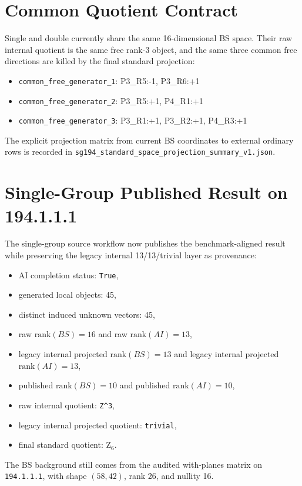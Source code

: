 \documentclass[11pt]{article}
\begin{document}
\section{Common Quotient Contract}
Single and double currently share the same 16-dimensional BS space. Their raw internal quotient is the same free rank-3 object, and the same three common free directions are killed by the final standard projection:
\begin{itemize}
\item \texttt{common\_free\_generator\_1}: P3\_R5:-1, P3\_R6:+1
\item \texttt{common\_free\_generator\_2}: P3\_R5:+1, P4\_R1:+1
\item \texttt{common\_free\_generator\_3}: P3\_R1:+1, P3\_R2:+1, P4\_R3:+1
\end{itemize}

The explicit projection matrix from current BS coordinates to external ordinary rows is recorded in \texttt{sg194\_standard\_space\_projection\_summary\_v1.json}.

\section{Single-Group Published Result on 194.1.1.1}
The single-group source workflow now publishes the benchmark-aligned result while preserving the legacy internal 13/13/trivial layer as provenance:
\begin{itemize}
\item AI completion status: \texttt{True},
\item generated local objects: 45,
\item distinct induced unknown vectors: 45,
\item raw $\mathrm{rank}(BS) = 16$ and raw $\mathrm{rank}(AI) = 13$,
\item legacy internal projected $\mathrm{rank}(BS) = 13$ and legacy internal projected $\mathrm{rank}(AI) = 13$,
\item published $\mathrm{rank}(BS) = 10$ and published $\mathrm{rank}(AI) = 10$,
\item raw internal quotient: \texttt{Z\textasciicircum{}3},
\item legacy internal projected quotient: \texttt{trivial},
\item final standard quotient: $\mathrm{Z}_{6}$.
\end{itemize}
The BS background still comes from the audited with-planes matrix on \texttt{194.1.1.1}, with shape $(58,42)$, rank 26, and nullity 16.
\end{document}
